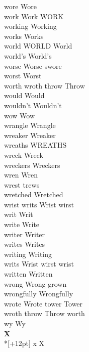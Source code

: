wore Wore\\
work Work WORK\\
working Working\\
works Works\\
world WORLD World\\
world's World's\\
worse Worse swore\\
worst Worst\\
worth wroth throw Throw\\
would Would\\
wouldn't Wouldn't\\
wow Wow\\
wrangle Wrangle\\
wreaker Wreaker\\
wreaths WREATHS\\
wreck Wreck\\
wreckers Wreckers\\
wren Wren\\
wrest trews\\
wretched Wretched\\
wrist writs Wrist wirst\\
writ Writ\\
write Write\\
writer Writer\\
writes Writes\\
writing Writing\\
writs Wrist wirst wrist\\
written Written\\
wrong Wrong grown\\
wrongfully Wrongfully\\
wrote Wrote tower Tower\\
wroth throw Throw worth\\
wy Wy\\

\vspace{14pt}
\noindent\textbf{\Large X}\\*[+12pt]
x X\\

